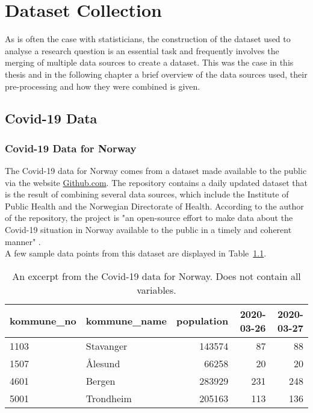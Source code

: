%
\chapter{Dataset Collection}
As is often the case with statisticians, the construction of the dataset used to analyse a research question is an essential task and frequently involves the merging of multiple data sources to create a dataset. This was the case in this thesis and in the following chapter a brief overview of the data sources used, their pre-processing and how they were combined is given.
\label{sec:datacollection}
\section{Covid-19 Data}
\subsection*{Covid-19 Data for Norway}
The Covid-19 data for Norway comes from a dataset made available to the public via the website \href{https://www.github.com}{Github.com}. The repository contains a daily updated dataset that is the result of combining several data sources, which include the Institute of Public Health and the Norwegian Directorate of Health. According to the author of the repository, the project is "an open-source effort to make data about the Covid-19 situation in Norway available to the public in a timely and coherent manner" \cite{thohan88}. \\
A few sample data points from this dataset are displayed in Table~\ref{datasetNorge}.\\
\begin{table}[H] 
\caption{An excerpt from the Covid-19 data for Norway. Does not contain all variables.\label{datasetNorge}}
\begin{tabular}{l l r r r}
\toprule
\textbf{kommune\_no}	& \textbf{kommune\_name}	& \textbf{population}	& \textbf{2020-03-26}	& \textbf{2020-03-27}\\
\midrule
1103 & Stavanger & 143574 & 87 & 88 \\
1507 & Ålesund & 66258 & 20 & 20 \\
4601 & Bergen & 283929 & 231 & 248 \\
5001 & Trondheim & 205163 & 113 & 136 \\
\bottomrule
\end{tabular}
\end{table}
